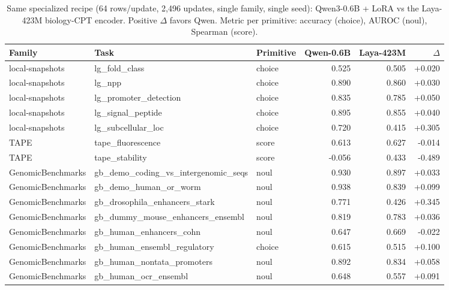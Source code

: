 \begin{table}[t]
\centering
\caption{Same specialized recipe (64 rows/update, 2{,}496 updates, single family, single seed): Qwen3-0.6B + LoRA vs the Laya-423M biology-CPT encoder. Positive $\Delta$ favors Qwen. Metric per primitive: accuracy (choice), AUROC (noul), Spearman (score).}
\label{tab:layavsqwen}
\footnotesize
\begin{tabular}{lllrrr}
\toprule
Family & Task & Primitive & Qwen-0.6B & Laya-423M & $\Delta$ \\
\midrule
local-snapshots & lg\_fold\_class & choice & 0.525 & 0.505 & +0.020 \\
local-snapshots & lg\_npp & choice & 0.890 & 0.860 & +0.030 \\
local-snapshots & lg\_promoter\_detection & choice & 0.835 & 0.785 & +0.050 \\
local-snapshots & lg\_signal\_peptide & choice & 0.895 & 0.855 & +0.040 \\
local-snapshots & lg\_subcellular\_loc & choice & 0.720 & 0.415 & +0.305 \\
TAPE & tape\_fluorescence & score & 0.613 & 0.627 & -0.014 \\
TAPE & tape\_stability & score & -0.056 & 0.433 & -0.489 \\
GenomicBenchmarks & gb\_demo\_coding\_vs\_intergenomic\_seqs & noul & 0.930 & 0.897 & +0.033 \\
GenomicBenchmarks & gb\_demo\_human\_or\_worm & noul & 0.938 & 0.839 & +0.099 \\
GenomicBenchmarks & gb\_drosophila\_enhancers\_stark & noul & 0.771 & 0.426 & +0.345 \\
GenomicBenchmarks & gb\_dummy\_mouse\_enhancers\_ensembl & noul & 0.819 & 0.783 & +0.036 \\
GenomicBenchmarks & gb\_human\_enhancers\_cohn & noul & 0.647 & 0.669 & -0.022 \\
GenomicBenchmarks & gb\_human\_ensembl\_regulatory & choice & 0.615 & 0.515 & +0.100 \\
GenomicBenchmarks & gb\_human\_nontata\_promoters & noul & 0.892 & 0.834 & +0.058 \\
GenomicBenchmarks & gb\_human\_ocr\_ensembl & noul & 0.648 & 0.557 & +0.091 \\
\bottomrule
\end{tabular}
\end{table}
